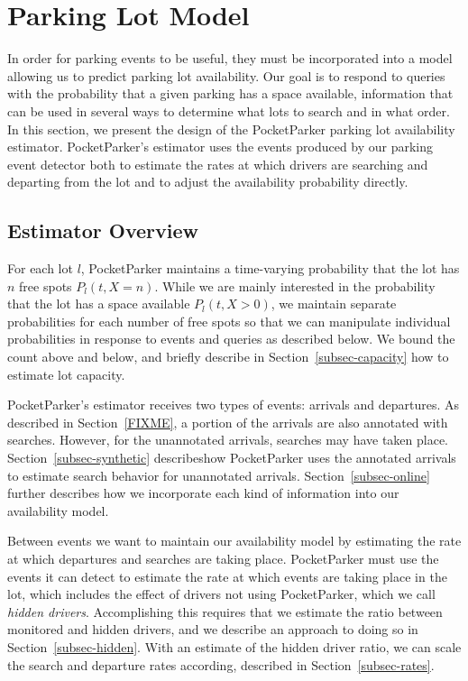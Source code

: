 \clearpage
\newpage

\section{Parking Lot Model}
\label{sec-model}

In order for parking events to be useful, they must be incorporated into a
model allowing us to predict parking lot availability. Our goal is to respond
to queries with the probability that a given parking has a space available,
information that can be used in several ways to determine what lots to search
and in what order. In this section, we present the design of the PocketParker
parking lot availability estimator. PocketParker's estimator uses the events
produced by our parking event detector both to estimate the rates at which
drivers are searching and departing from the lot and to adjust the
availability probability directly.

\subsection{Estimator Overview}

For each lot $l$, PocketParker maintains a time-varying probability that the
lot has $n$ free spots $P_l(t, X = n)$. While we are mainly interested in the
probability that the lot has a space available $P_l(t, X > 0)$, we maintain
separate probabilities for each number of free spots so that we can
manipulate individual probabilities in response to events and queries as
described below. We bound the count above and below, and briefly describe in
Section~\ref{subsec-capacity} how to estimate lot capacity.

PocketParker's estimator receives two types of events: arrivals and
departures. As described in Section~\ref{FIXME}, a portion of the
arrivals are also annotated with searches. However, for the unannotated
arrivals, searches may have taken place. Section~\ref{subsec-synthetic}
describeshow PocketParker uses the annotated arrivals to estimate search
behavior for unannotated arrivals. Section~\ref{subsec-online} further
describes how we incorporate each kind of information into our availability
model.

Between events we want to maintain our availability model by estimating the
rate at which departures and searches are taking place. PocketParker must use
the events it can detect to estimate the rate at which events are taking
place in the lot, which includes the effect of drivers not using
PocketParker, which we call \textit{hidden drivers}. Accomplishing this
requires that we estimate the ratio between monitored and hidden drivers, and
we describe an approach to doing so in Section~\ref{subsec-hidden}. With an
estimate of the hidden driver ratio, we can scale the search and departure
rates according, described in Section~\ref{subsec-rates}.

